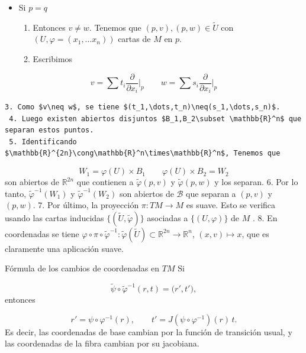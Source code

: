 \begin{bookproof}{}
\begin{itemize}
\begin{enumerate}
\item como $M$ es Hausdorff, existen abiertos disjuntos $U,V\subset M$ tales que $p\in U$ y $q\in V$. Entonces $\tilde{U}=\pi^{-1}(U)$ y $\tilde{V}=\pi^{-1}(V)$ son abiertos disjuntos por \hyperref[blk:4762ec]{Teórico 7} y que separan $(p,v)$ y $(q,w)$.
\end{enumerate}
\item Si $p=q$

\begin{enumerate}
\item Entonces $v\neq w$. Tenemos que $(p,v),(p,w)\in \tilde{U}$ con $(U,\varphi=(x_{1},\ldots x_{n}))$ cartas de $M$ en $p$.
\item Escribimos
\end{enumerate}
\end{itemize}
\[
v=\sum t_i\frac{\partial}{\partial x_{i}}\big|_p \qquad w=\sum s_i\frac{\partial}{\partial x_{i}}\big|_p
\]
\begin{Verbatim}[fontsize=\small]
 3. Como $v\neq w$, se tiene $(t_1,\dots,t_n)\neq(s_1,\dots,s_n)$.
 4. Luego existen abiertos disjuntos $B_1,B_2\subset \mathbb{R}^n$ que separan estos puntos. 
 5. Identificando $\mathbb{R}^{2n}\cong\mathbb{R}^n\times\mathbb{R}^n$, Tenemos que 
\end{Verbatim}
\[
W_{1}=\varphi(U)\times B_1 \qquad \varphi(U)\times B_2=W_2
\]
son abiertos de $\mathbb{R}^{2n}$ que contienen a $\tilde{\varphi}(p,v)$ y $\tilde{\varphi}(p,w)$ y los separan. 6. Por lo tanto, $\tilde{\varphi}^{-1}(W_1)$ y $\tilde{\varphi}^{-1}(W_2)$ son abiertos de $\mathcal{B}$ que separan a $(p,v)$ y $(p,w)$. 7. Por último, la proyección $\pi:TM\to M$ es suave. Esto se verifica usando las cartas inducidas $\{(\tilde{U},\tilde{\varphi})\}$ asociadas a $\{(U,\varphi)\}$ de $M$ . 8. En coordenadas se tiene $\varphi\circ\pi\circ\tilde{\varphi}^{-1}:\tilde{\varphi}(\tilde{U})\subset\mathbb{R}^{2n}\to\mathbb{R}^n$, $(x,v)\mapsto x$, que es claramente una aplicación suave.

\bookqed
\end{bookproof}
\begin{bookremark}{Fórmula de los cambios de coordenadas en $TM$}
Si

\[
\widetilde\psi\circ\widetilde\varphi^{-1}(r,t)=\bigl(r',t'\bigr),
\]
entonces

\[
r'=\psi\circ\varphi^{-1}(r),
\qquad
t'=J(\psi\circ\varphi^{-1})(r)\,t.
\]
Es decir, las coordenadas de base cambian por la función de transición usual, y las coordenadas de la fibra cambian por su jacobiana.

\end{bookremark}
